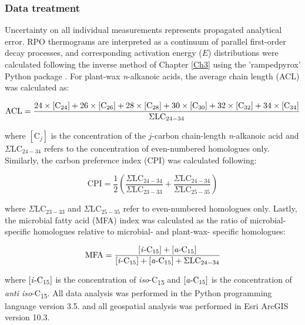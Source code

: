 \subsubsection{Data treatment}

Uncertainty on all individual measurements represents propagated analytical error. RPO thermograms are interpreted as a continuum of parallel first-order decay processes, and corresponding activation energy ($E$) distributions were calculated following the inverse method of Chapter \ref{Ch3} using the 'rampedpyrox' Python package \citep{Hemingway:bA3-kvLz}. For plant-wax \textit{n}-alkanoic acids, the average chain length (ACL) was calculated as:

\begin{equation}\label{Ch6Eq:1}
\text{ACL} = \frac{24\times[\ce{C}_{24}] + 26\times[\ce{C}_{26}] + 28\times[\ce{C}_{28}] + 30\times[\ce{C}_{30}] + 32\times[\ce{C}_{32}] + 34\times[\ce{C}_{34}]}{\Sigma \text{LC}_{24-34}}
\end{equation}

where $[\text{C}_{j}]$ is the concentration of the $j$-carbon chain-length \textit{n}-alkanoic acid and $\Sigma \text{LC}_{24-34}$ refers to the concentration of even-numbered homologues only. Similarly, the carbon preference index (CPI) was calculated following:

\begin{equation}\label{Ch6Eq:2}
\text{CPI} = \frac{1}{2} \left( \frac{\Sigma \text{LC}_{24-34}}{\Sigma \text{LC}_{23-33}} + \frac{\Sigma \text{LC}_{24-34}}{\Sigma \text{LC}_{25-35}} \right)
\end{equation}

where $\Sigma \text{LC}_{23-33}$ and $\Sigma \text{LC}_{25-35}$ refer to even-numbered homologues only. Lastly, the microbial fatty acid (MFA) index was calculated as the ratio of microbial-specific homologues relative to microbial- and plant-wax- specific homologues:

\begin{equation}\label{Ch6Eq:3}
\text{MFA} = \frac{[\text{\textit{i}-C}_{15}] + [\text{\textit{a}-C}_{15}]}{[\text{\textit{i}-C}_{15}] + [\text{\textit{a}-C}_{15}] + \Sigma \text{LC}_{24-34}}
\end{equation}

where $[\text{\textit{i}-C}_{15}]$ is the concentration of \textit{iso}-C\textsubscript{15} and $[\text{\textit{a}-C}_{15}]$ is the concentration of \textit{anti iso}-C\textsubscript{15}. All data analysis was performed in the Python programming language version 3.5. and all geospatial analysis was performed in Esri ArcGIS version 10.3.

